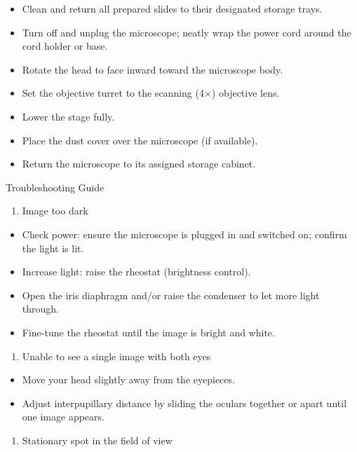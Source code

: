 \documentclass[
  letterpaper,
  DIV=11,
  numbers=noendperiod]{scrreprt}
\providecommand{\tightlist}{%
  \setlength{\itemsep}{0pt}\setlength{\parskip}{0pt}}
\begin{document}
\begin{itemize}
\item
  Clean and return all prepared slides to their designated storage
  trays.
\item
  Turn off and unplug the microscope; neatly wrap the power cord around
  the cord holder or base.
\item
  Rotate the head to face inward toward the microscope body.
\item
  Set the objective turret to the scanning (4×) objective lens.
\item
  Lower the stage fully.
\item
  Place the dust cover over the microscope (if available).
\item
  Return the microscope to its assigned storage cabinet.
\end{itemize}

Troubleshooting Guide

\begin{enumerate}
\def\labelenumi{\arabic{enumi}.}
\tightlist
\item
  Image too dark
\end{enumerate}

\begin{itemize}
\item
  Check power: ensure the microscope is plugged in and switched on;
  confirm the light is lit.
\item
  Increase light: raise the rheostat (brightness control).
\item
  Open the iris diaphragm and/or raise the condenser to let more light
  through.
\item
  Fine-tune the rheostat until the image is bright and white.
\end{itemize}

\begin{enumerate}
\def\labelenumi{\arabic{enumi}.}
\setcounter{enumi}{1}
\tightlist
\item
  Unable to see a single image with both eyes
\end{enumerate}

\begin{itemize}
\item
  Move your head slightly away from the eyepieces.
\item
  Adjust interpupillary distance by sliding the oculars together or
  apart until one image appears.
\end{itemize}

\begin{enumerate}
\def\labelenumi{\arabic{enumi}.}
\setcounter{enumi}{2}
\tightlist
\item
  Stationary spot in the field of view
\end{enumerate}
\end{document}

